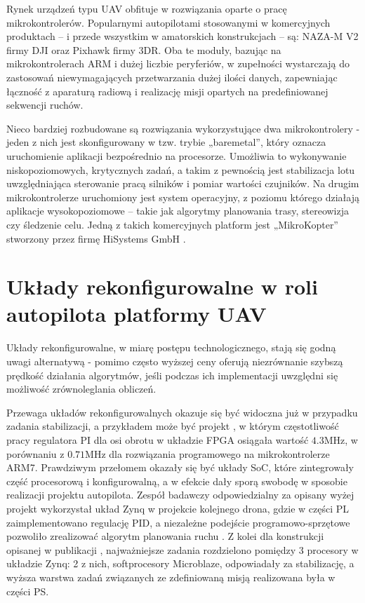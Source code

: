 Rynek urządzeń typu UAV obfituje w rozwiązania oparte o pracę mikrokontrolerów. Popularnymi autopilotami stosowanymi w komercyjnych produktach -- i przede wszystkim w amatorskich konstrukcjach -- są: NAZA-M V2 firmy DJI oraz Pixhawk firmy 3DR. Oba te moduły, bazując na mikrokontrolerach ARM i dużej liczbie peryferiów, w zupełności wystarczają do zastosowań niewymagających przetwarzania dużej ilości danych, zapewniając łączność z aparaturą radiową i realizację misji opartych na predefiniowanej sekwencji ruchów. 

Nieco bardziej rozbudowane są rozwiązania wykorzystujące dwa mikrokontrolery - jeden z nich jest skonfigurowany w tzw. trybie „baremetal”, który oznacza uruchomienie aplikacji bezpośrednio na procesorze. Umożliwia to wykonywanie niskopoziomowych, krytycznych zadań, a takim z pewnością jest stabilizacja lotu uwzględniająca sterowanie pracą silników i pomiar wartości czujników. Na drugim mikrokontrolerze uruchomiony jest system operacyjny, z poziomu którego działają aplikacje wysokopoziomowe -- takie jak algorytmy planowania trasy, stereowizja czy śledzenie celu. Jedną z takich komercyjnych platform jest „MikroKopter” stworzony przez firmę HiSystems GmbH \cite{MikroKopter}.

\section{Układy rekonfigurowalne w roli autopilota platformy UAV}

Układy rekonfigurowalne, w miarę postępu technologicznego, stają się godną uwagi alternatywą - pomimo często wyższej ceny oferują niezrównanie szybszą prędkość działania algorytmów, jeśli podczas ich implementacji uwzględni się możliwość zrównoleglania obliczeń. 

Przewaga układów rekonfigurowalnych okazuje się być widoczna już w przypadku zadania stabilizacji, a przykładem może być projekt \cite{Eizad}, w którym częstotliwość pracy regulatora PI dla osi obrotu w układzie FPGA osiągała wartość $4.3$MHz, w porównaniu z $0.71$MHz dla rozwiązania programowego na mikrokontrolerze ARM7. Prawdziwym przełomem okazały się być układy SoC, które zintegrowały część procesorową i konfigurowalną, a w efekcie dały sporą swobodę w sposobie realizacji projektu autopilota. Zespół badawczy odpowiedzialny za opisany wyżej projekt wykorzystał układ Zynq w projekcie kolejnego drona, gdzie w części PL zaimplementowano regulację PID, a niezależne podejście programowo-sprzętowe pozwoliło zrealizować algorytm planowania ruchu \cite{Eizad2}. Z kolei dla konstrukcji opisanej w publikacji \cite{Schlender}, najważniejsze zadania rozdzielono pomiędzy 3 procesory w układzie Zynq: 2 z nich, softprocesory Microblaze, odpowiadały za stabilizację, a wyższa warstwa zadań związanych ze zdefiniowaną misją realizowana była w części PS.

